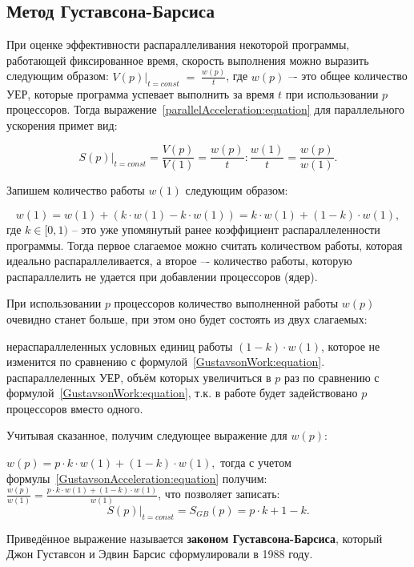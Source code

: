 \subsection{Метод Густавсона-Барсиса}

При оценке эффективности распараллеливания некоторой программы, работающей фиксированное время, скорость выполнения можно выразить следующим образом: $\left.V(p)\right|_{t=const}\;=\;\frac {w(p)}t$, где $w(p)$ –- это общее количество УЕР, которые программа успевает выполнить за время $t$ при использовании $p$ процессоров. Тогда выражение~\eqref{parallelAcceleration:equation} для параллельного ускорения примет вид:

\begin{equation}
    \label{GustavsonAcceleration:equation}
    \left.S(p)\right|_{t=const} = \frac{V(p)}{V(1)} = \frac{w(p)}{t} : \frac{w(1)}{t} = \frac{w(p)}{w(1)}.
\end{equation}

Запишем количество работы $w(1)$ следующим образом:

\begin{equation}
    \label{GustavsonWork:equation}
    w(1) = w(1) + (k \cdot w(1) - k \cdot w(1)) = k \cdot w(1) + (1 - k) \cdot w(1),
\end{equation}
где $k\in[0,1)$ -- это уже упомянутый ранее коэффициент распараллеленности программы. Тогда первое слагаемое можно считать количеством работы, которая идеально распараллеливается, а второе –- количество работы, которую распараллелить не удается при добавлении процессоров (ядер).

При использовании $p$ процессоров количество выполненной работы $w(p)$ очевидно станет больше, при этом оно  будет состоять из двух слагаемых: 

\begin{itemize}
     нераспараллеленных условных единиц работы $(1-k) \cdot w(1)$, которое не изменится по сравнению с формулой~\eqref{GustavsonWork:equation}.
     распараллеленных УЕР, объём которых увеличиться в $p$ раз по сравнению с формулой~\eqref{GustavsonWork:equation}, т.к. в работе будет задействовано $p$ процессоров вместо одного.
\end{itemize}

Учитывая сказанное, получим следующее выражение для $w(p)$:

$w(p) = p \cdot k \cdot w(1) + (1 - k) \cdot w(1),$ тогда с учетом формулы~\eqref{GustavsonAcceleration:equation} получим: $\frac{w(p)}{w(1)} = \frac{p \cdot k \cdot w(1) + (1 - k) \cdot w(1)}{w(1)}$, что позволяет записать:
\begin{equation}
    \left.S(p)\right|_{t=const} = S_{GB}(p) = p \cdot k + 1 - k.
\end{equation}

Приведённое выражение называется \textbf{законом Густавсона-Барсиса}, который Джон Густавсон и Эдвин Барсис сформулировали в 1988 году. 
